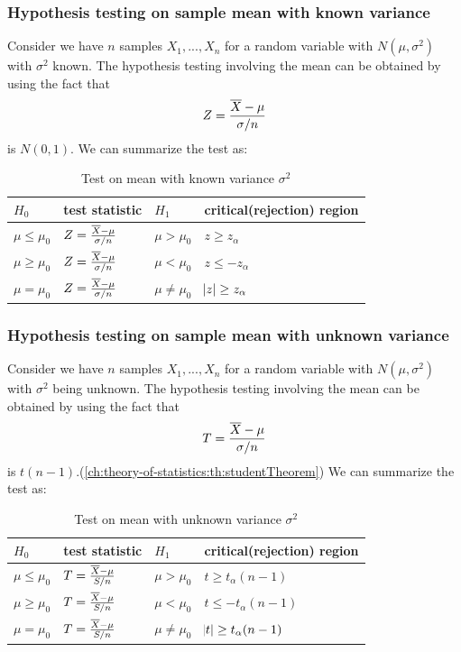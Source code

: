 \begin{refsection}
\subsubsection{Hypothesis testing on sample mean with known variance}
Consider we have $n$ samples $X_1,...,X_n$ for a random variable with $N(\mu,\sigma^2)$ with $\sigma^2$ known. The hypothesis testing involving the mean can be obtained by using the fact that $$Z = \frac{\overline{X} - \mu}{\sigma/n}$$ is $N(0,1)$. We can summarize the test as:
\begin{table}[H]
	\centering
	\caption{Test on mean with known variance $\sigma^2$}
	\begin{tabular}{|l|l|l|l|}
		\hline
		$H_0$	& test statistic  & $H_1$ & critical(rejection) region \\ \hline
		$\mu \leq \mu_0$ &$Z = \frac{\overline{X} - \mu}{\sigma/n}$ & $\mu > \mu_0$
		&  $z\geq z_\alpha$ \\ \hline
		$\mu \geq \mu_0$ & $Z = \frac{\overline{X} - \mu}{\sigma/n}$ & $\mu < \mu_0$
		& $z\leq -z_\alpha$ \\ \hline
		$\mu = \mu_0$ &  $Z = \frac{\overline{X} - \mu}{\sigma/n}$ & $\mu \neq \mu_0$
		&  $\abs{z}\geq z_\alpha$\\ \hline
	\end{tabular}
\end{table}


\subsubsection{Hypothesis testing on sample mean with unknown variance}
Consider we have $n$ samples $X_1,...,X_n$ for a random variable with $N(\mu,\sigma^2)$ with $\sigma^2$ being unknown. The hypothesis testing involving the mean can be obtained by using the fact that $$T = \frac{\overline{X} - \mu}{\sigma/n}$$ is $t(n-1)$.(\autoref{ch:theory-of-statistics:th:studentTheorem}) We can summarize the test as:
\begin{table}[H]
	\centering
	\caption{Test on mean with unknown variance $\sigma^2$}
	\begin{tabular}{|l|l|l|l|}
		\hline
		$H_0$	& test statistic  & $H_1$ & critical(rejection) region \\ \hline
		$\mu \leq \mu_0$ &$T = \frac{\overline{X} - \mu}{S/n}$ & $\mu > \mu_0$
		&  $t\geq t_\alpha(n-1)$ \\ \hline
		$\mu \geq \mu_0$ & $T = \frac{\overline{X} - \mu}{S/n}$ & $\mu < \mu_0$
		& $t\leq -t_\alpha(n-1)$ \\ \hline
		$\mu = \mu_0$ &  $T = \frac{\overline{X} - \mu}{S/n}$ & $\mu \neq \mu_0$
		&  $\abs{t}\geq t_\alpha(n-1)$\\ \hline
	\end{tabular}
\end{table}


\end{refsection}
